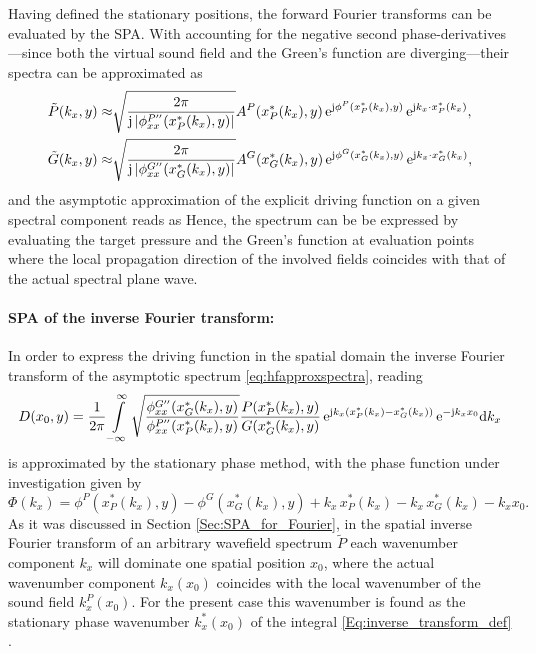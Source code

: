 Having defined the stationary positions, the forward Fourier transforms can be evaluated by the SPA. 
With accounting for the negative second phase-derivatives---since both the virtual sound field and the Green's function are diverging---their spectra can be approximated as \cite[Ch. 5]{Tracy2014}
\begin{align}
\tilde{P}(k_x,y) \approx& \sqrt{\frac{2\pi}{\mathrm{j} \, |\phi^{P''}_{xx}(x^*_P(k_x),y)|}} A^P(x^*_P(k_x),y) \, \mathrm{e}^{\mathrm{j} \phi^P(x^*_P(k_x),y)} \, \mathrm{e}^{\mathrm{j} k_x \cdot x^*_P(k_x)},\\
\tilde{G}(k_x,y) \approx& \sqrt{\frac{2\pi}{\mathrm{j} \, |\phi^{G''}_{xx}(x^*_G(k_x),y)|}} A^G(x^*_G(k_x),y) \, \mathrm{e}^{\mathrm{j} \phi^G(x^*_G(k_x),y)} \, \mathrm{e}^{\mathrm{j} k_x \cdot x^*_G(k_x)},
\end{align}
and the asymptotic approximation of the explicit driving function on a given spectral component reads as
Hence, the spectrum can be be expressed by evaluating the target pressure and the Green's function at evaluation points where the local propagation direction of the involved fields coincides with that of the actual spectral plane wave.


\paragraph{SPA of the inverse Fourier transform:}
In order to express the driving function in the spatial domain the inverse Fourier transform of the asymptotic spectrum \eqref{eq:hfapproxspectra}, reading
%
\begin{equation}
\label{Eq:inverse_transform_def}
D(x_0,y)
=  \frac{1}{2\pi} \int\limits_{-\infty}^{\infty}
\sqrt{\frac{\phi^{G''}_{xx}(x^*_G(k_x),y)}{\phi^{P''}_{xx}(x^*_P(k_x),y)}} 
\frac{P(x^*_P(k_x),y)}{G(x^*_G(k_x),y)}
\,\mathrm{e}^{\mathrm{j} k_x \left( x^*_P(k_x) - x^*_G(k_x)\right)}
\,\mathrm{e}^{-\mathrm{j} k_x x_0} \mathrm{d} k_x
\end{equation}
is approximated by the stationary phase method, with the phase function under investigation given by
\begin{equation}
\label{Eq:inverse_transform_phase_function}
{\Phi}(k_x) = \phi^P(x^*_P(k_x),y) -  \phi^G(x^*_G(k_x),y) +  k_x \, x^*_P(k_x) - k_x\, x^*_G(k_x) -  k_x x_0.
\end{equation}
%
As it was discussed in Section \ref{Sec:SPA_for_Fourier}, in the spatial inverse Fourier transform of an arbitrary wavefield spectrum $\tilde{P}$ each wavenumber component $k_x$ will dominate one spatial position $x_0$, where the actual wavenumber component $k_x(x_0)$ coincides with the local wavenumber of the sound field $k_x^P(x_0)$.
For the present case this wavenumber is found as the stationary phase wavenumber $k_x^*(x_0)$ of the integral \eqref{Eq:inverse_transform_def} \cite{Tracy2014}.

